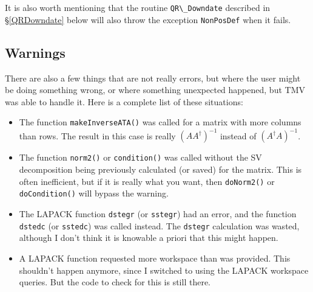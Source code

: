 \documentclass[twoside,letterpaper,11pt]{article}
\renewcommand{\tt}[1]{{\lstinline {#1}}}
\begin{document}
It is also worth mentioning that the routine \tt{QR\_Downdate} described in \S\ref{QRDowndate}
below will also throw the exception \tt{NonPosDef} when it fails.

\subsection{Warnings}
\label{Warnings}

There are also a few things that are not really errors, but where the user might be doing
something wrong, or where something unexpected happened, but TMV was able to handle it.
Here is a complete list of these situations:
\begin{itemize}
\item The function \tt{makeInverseATA()} was called for a matrix with more columns than rows.
The result in this case is really $(AA^\dagger)^{-1}$ instead of $(A^\dagger A)^{-1}$.
\item The function \tt{norm2()} or \tt{condition()} was called without the SV decomposition
being previously calculated (or saved) for the matrix.  This is often inefficient, but if it is really what you
want, then \tt{doNorm2()} or \tt{doCondition()} will bypass the warning.
\item The LAPACK function \tt{dstegr} (or \tt{sstegr}) had an error, and the function
\tt{dstedc} (or \tt{sstedc}) was called instead.  The \tt{dstegr} calculation was wasted,
although I don't think it is knowable a priori that this might happen.
\item A LAPACK function requested more workspace than was provided.  This shouldn't happen
anymore, since I switched to using the LAPACK workspace queries.  But the code to check
for this is still there.
\end{itemize}
\end{document}
